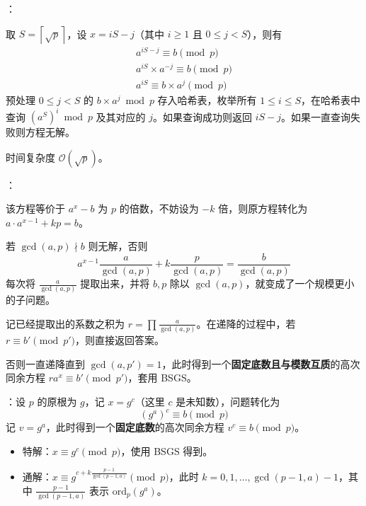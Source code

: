：

取 $S = \left\lceil \sqrt{p} \right\rceil$，设 $x = iS - j$（其中 $i \geq 1$ 且 $0 \leq j < S$），则有
\[
\begin{gathered}
a^{iS - j} \equiv b \pmod p \\
a^{iS} \times a^{-j} \equiv b \pmod p \\
a^{iS} \equiv b \times a^j \pmod p
\end{gathered}
\]
预处理 $0 \leq j < S$ 的 $b\times a^j \bmod p$ 存入哈希表，枚举所有 $1 \leq i \leq S$，在哈希表中查询 $(a^S)^i \bmod p$ 及其对应的 $j$。如果查询成功则返回 $iS - j$。如果一直查询失败则方程无解。

时间复杂度 $\mathcal{O}(\sqrt{p})$。


：

该方程等价于 $a^x - b$ 为 $p$ 的倍数，不妨设为 $-k$ 倍，则原方程转化为 $a\cdot a^{x - 1} + kp = b$。

若 $\gcd(a, p) \nmid b$ 则无解，否则
\[
a^{x - 1} \frac{a}{\gcd(a, p)} + k\frac{p}{\gcd(a, p)} = \frac{b}{\gcd(a, p)}
\]
每次将 $\frac{a}{\gcd(a, p)}$ 提取出来，并将 $b, p$ 除以 $\gcd(a, p)$，就变成了一个规模更小的子问题。

记已经提取出的系数之积为 $r = \prod \frac{a}{\gcd(a, p)}$。在递降的过程中，若 $r \equiv b' \pmod{p'}$，则直接返回答案。

否则一直递降直到 $\gcd(a, p') = 1$，此时得到一个\textbf{固定底数且与模数互质}的高次同余方程 $ra^x \equiv b' \pmod{p'}$，套用 BSGS。


：设 $p$ 的原根为 $g$，记 $x = g^c$（这里 $c$ 是未知数），问题转化为
\[
(g^a)^c \equiv b \pmod p
\]
记 $v = g^a$，此时得到一个\textbf{固定底数}的高次同余方程 $v^c \equiv b \pmod p$。

\begin{itemize}
    \item 特解：$x \equiv g^{c} \pmod p$，使用 BSGS 得到。
    \item 通解：$x \equiv g^{c + k\frac{p - 1}{\gcd(p - 1, a)}} \pmod{p}$，此时 $k = 0, 1, \dots, \gcd(p - 1, a) - 1$，其中 $\frac{p - 1}{\gcd(p - 1, a)}$ 表示 $\mathrm{ord}_p(g^a)$。
\end{itemize}

